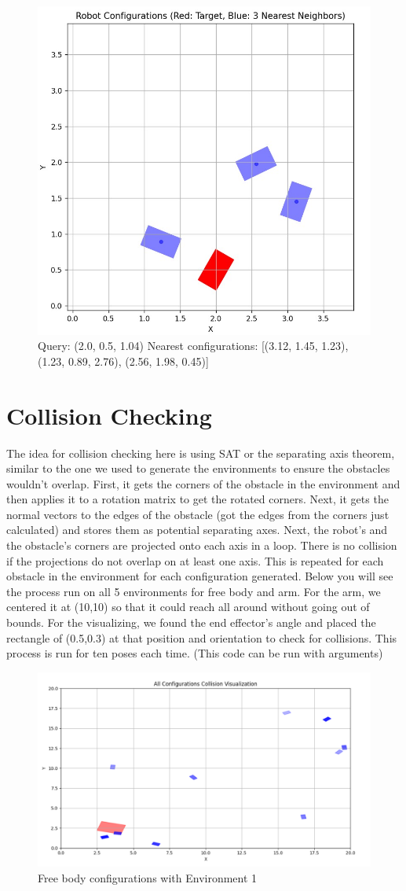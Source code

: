 \documentclass{article}
\begin{document}
\begin{figure} [H]
    \centering
    \includegraphics[width=0.5\linewidth]{latex_media/nearestFreeBody3.jpg}
    \caption{Query: (2.0, 0.5, 1.04)
    Nearest configurations: [(3.12, 1.45, 1.23), (1.23, 0.89, 2.76), (2.56, 1.98, 0.45)]}
\end{figure}

\section{Collision Checking}

The idea for collision checking here is using SAT or the separating axis theorem, similar to the one we used to generate the environments to ensure the obstacles wouldn't overlap. First, it gets the corners of the obstacle in the environment and then applies it to a rotation matrix to get the rotated corners. Next, it gets the normal vectors to the edges of the obstacle (got the edges from the corners just calculated) and stores them as potential separating axes. Next, the robot's and the obstacle's corners are projected onto each axis in a loop. There is no collision if the projections do not overlap on at least one axis. This is repeated for each obstacle in the environment for each configuration generated. Below you will see the process run on all 5 environments for free body and arm. For the arm, we centered it at (10,10) so that it could reach all around without going out of bounds. For the visualizing, we found the end effector's angle and placed the rectangle of (0.5,0.3) at that position and orientation to check for collisions. This process is run for ten poses each time. (This code can be run with arguments)

\begin{figure} [H]
    \centering
    \includegraphics[width=0.7\linewidth]{latex_media/config_collision_freebody_env1.png}
    \caption{Free body configurations with Environment 1}
\end{figure}
\end{document}
